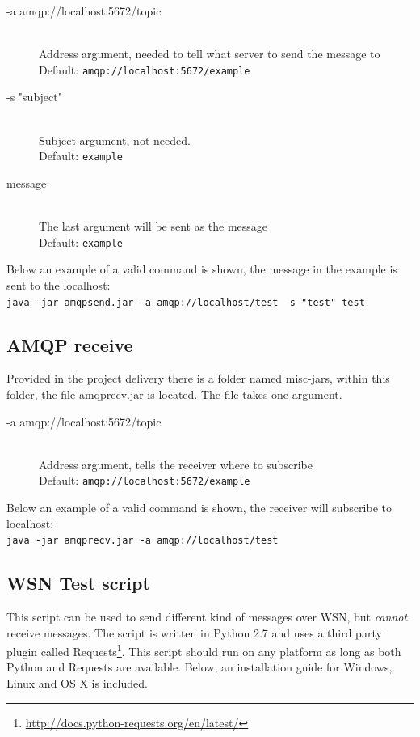 \begin{description}
    \item[-a amqp://localhost:5672/topic] \hfill \\
  Address argument, needed to tell what server to send the message to \hfill \\ Default: \verb!amqp://localhost:5672/example!
    \item[-s "subject"] \hfill \\
  Subject argument, not needed. \hfill \\ Default: \verb!example!
    \item[message] \hfill \\
  The last argument will be sent as the message \hfill \\ Default: \verb!example!
\end{description}
Below an example of a valid command is shown, the message in the example is sent to the localhost:\\\verb!java -jar amqpsend.jar -a amqp://localhost/test -s "test" test!

\subsection{AMQP receive}
\label{subsec:test_clients-amqp_receive}
Provided in the project delivery there is a folder named misc-jars, within this folder, the file amqprecv.jar is located. The file takes one argument.
 
\begin{description}
    \item[-a amqp://localhost:5672/topic] \hfill \\
  Address argument, tells the receiver where to subscribe \hfill \\ Default: \verb!amqp://localhost:5672/example!
\end{description}
Below an example of a valid command is shown, the receiver will subscribe to localhost:\\\verb!java -jar amqprecv.jar -a amqp://localhost/test!

\subsection{WSN Test script}
This script can be used to send different kind of messages over WSN, but \textit{cannot} receive messages. The script is written in Python 2.7 and uses a third party plugin called Requests\footnote{\url{http://docs.python-requests.org/en/latest/}}. This script should run on any platform as long as both Python and Requests are available. Below, an installation guide for Windows, Linux and OS X is included.

